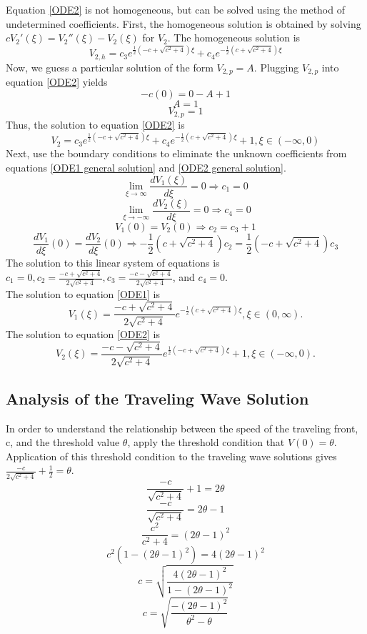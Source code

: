 \documentclass[11pt, oneside]{article}   	%
\begin{document}
Equation \ref{ODE2} is not homogeneous, but can be solved using the method of undetermined coefficients. First, the homogeneous solution is obtained by solving $cV_2'(\xi)=V_2''(\xi)-V_2(\xi)$ for $V_2$. The homogeneous solution is
$$V_{2,h}=c_3 e^{\frac{1}{2}(-c+\sqrt{c^2+4})\xi}+c_4 e^{-\frac{1}{2}(c+\sqrt{c^2+4})\xi}$$
Now, we guess a particular solution of the form $V_{2,p}=A$. Plugging $V_{2,p}$ into equation \ref{ODE2} yields 
$$-c(0)=0-A+1$$
$$A=1$$ 
$$V_{2,p}=1$$
Thus, the solution to equation \ref{ODE2} is 
\begin{equation}
\label{ODE2 general solution}
V_{2}=c_3 e^{\frac{1}{2}(-c+\sqrt{c^2+4})\xi}+c_4 e^{-\frac{1}{2}(c+\sqrt{c^2+4})\xi}+1, \xi \in (-\infty,0)
\end{equation}
Next, use the boundary conditions to eliminate the unknown coefficients from equations \ref{ODE1 general solution} and \ref{ODE2 general solution}. 
$$\lim_{\xi\to\infty} \frac{d V_1(\xi)}{d \xi}=0\Rightarrow c_1=0$$
$$\lim_{\xi\to-\infty} \frac{d V_2(\xi)}{d \xi}=0\Rightarrow c_4=0$$
$$V_1(0)=V_2(0)\Rightarrow c_2=c_3+1$$
$$\frac{d V_1}{d \xi}(0)=\frac{d V_2}{d \xi}(0)\Rightarrow -\frac{1}{2}(c+\sqrt{c^2+4}) c_2= \frac{1}{2}(-c+\sqrt{c^2+4})c_3$$ 
The solution to this linear system of equations is $c_1=0, c_2=\frac{-c+\sqrt{c^2+4}}{2\sqrt{c^2+4}}, c_3=\frac{-c-\sqrt{c^2+4}}{2\sqrt{c^2+4}}$, and $c_4=0$.\\
The solution to equation \ref{ODE1} is 
\begin{equation}
\label{ODE1 solution}
V_1(\xi)=\frac{-c+\sqrt{c^2+4}}{2\sqrt{c^2+4}}e^{-\frac{1}{2}(c+\sqrt{c^2+4})\xi},\xi \in (0,\infty).
\end{equation}
The solution to equation \ref{ODE2} is
\begin{equation}
\label{ODE2 solution}
V_2(\xi)=\frac{-c-\sqrt{c^2+4}}{2\sqrt{c^2+4}}e^{\frac{1}{2}(-c+\sqrt{c^2+4})\xi}+1,\xi \in (-\infty,0).
\end{equation}


\subsection{Analysis of the Traveling Wave Solution}
In order to understand the relationship between the speed of the traveling front, c, and the threshold value $\theta$, apply the threshold condition that $V(0)=\theta$. Application of this threshold condition to the traveling wave solutions gives $\frac{-c}{2\sqrt{c^2+4}}+\frac{1}{2}=\theta$.
$$\frac{-c}{\sqrt{c^2+4}}+1=2\theta$$
$$\frac{-c}{\sqrt{c^2+4}}=2\theta-1$$
$$\frac{c^2}{c^2+4}=(2\theta-1)^2$$
$$c^2(1-(2\theta-1)^2)=4(2\theta-1)^2$$
$$c=\sqrt{\frac{4(2\theta-1)^2}{1-(2\theta-1)^2}}$$
$$c=\sqrt{\frac{-(2\theta-1)^2}{\theta^2-\theta}}$$
\end{document}
